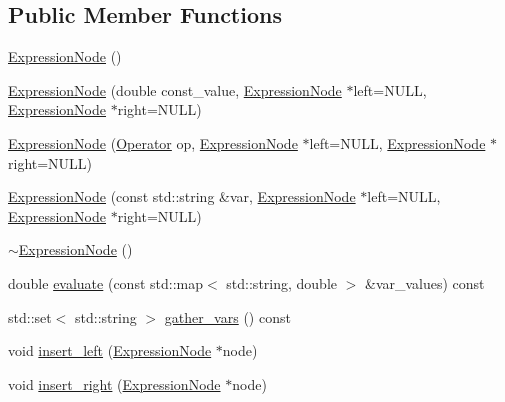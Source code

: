 \subsection*{Public Member Functions}
\begin{DoxyCompactItemize}
\item 
\hyperlink{classExpressionNode_adc8888de5329d356224c8a93f3ce2b75}{Expression\+Node} ()
\item 
\hyperlink{classExpressionNode_ac491d96562e48ee48b0964a8aa4ca021}{Expression\+Node} (double const\+\_\+value, \hyperlink{classExpressionNode}{Expression\+Node} $\ast$left=N\+U\+L\+L, \hyperlink{classExpressionNode}{Expression\+Node} $\ast$right=N\+U\+L\+L)
\item 
\hyperlink{classExpressionNode_a8a4fb4b121062ba2cae7c1237a17f654}{Expression\+Node} (\hyperlink{classExpressionNode_a7735465f9aac516880869e4a630d2569}{Operator} op, \hyperlink{classExpressionNode}{Expression\+Node} $\ast$left=N\+U\+L\+L, \hyperlink{classExpressionNode}{Expression\+Node} $\ast$right=N\+U\+L\+L)
\item 
\hyperlink{classExpressionNode_a972a7eec8f2e54d62f7f794ea8c0822d}{Expression\+Node} (const std\+::string \&var, \hyperlink{classExpressionNode}{Expression\+Node} $\ast$left=N\+U\+L\+L, \hyperlink{classExpressionNode}{Expression\+Node} $\ast$right=N\+U\+L\+L)
\item 
\hyperlink{classExpressionNode_aa834d6d0e96a958d22609dad612b54b0}{$\sim$\+Expression\+Node} ()
\item 
double \hyperlink{classExpressionNode_a1cd07cfe8bcf29e2bfbf686498cf1c55}{evaluate} (const std\+::map$<$ std\+::string, double $>$ \&var\+\_\+values) const 
\item 
std\+::set$<$ std\+::string $>$ \hyperlink{classExpressionNode_a7890a071ed7f066c26724df3d3d76600}{gather\+\_\+vars} () const 
\item 
void \hyperlink{classExpressionNode_adc8d847caf5c0d3c6aaa09fc3e0362d4}{insert\+\_\+left} (\hyperlink{classExpressionNode}{Expression\+Node} $\ast$node)
\item 
void \hyperlink{classExpressionNode_abbed368ef2d24f2b939bf5e9591e7c9b}{insert\+\_\+right} (\hyperlink{classExpressionNode}{Expression\+Node} $\ast$node)
\end{DoxyCompactItemize}
